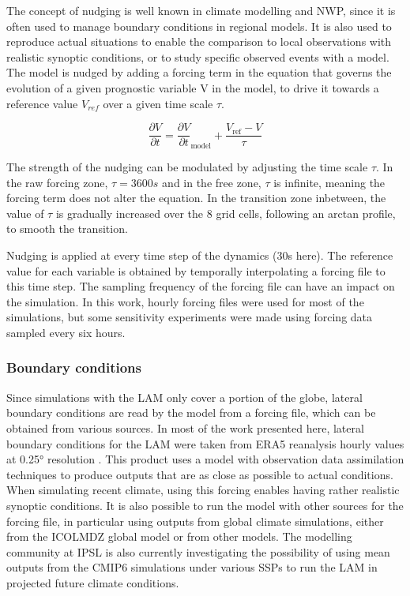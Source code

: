 The concept of nudging is well known in climate modelling and NWP, since it is often used to manage boundary conditions in regional models. It is also used to reproduce actual situations to enable the comparison to local observations with realistic synoptic conditions, or to study specific observed events with a model. The model is nudged by adding a forcing term in the equation that governs the evolution of a given prognostic variable V in the model, to drive it towards a reference value $V_{ref}$ over a given time scale $\tau$.

\begin{equation}
    \frac{\partial V}{\partial t} = \frac{\partial V}{\partial t}_{\text{model}}+ \frac{V_{\text{ref}} - V}{\tau}
\end{equation}

The strength of the nudging can be modulated by adjusting the time scale $\tau$.
In the raw forcing zone, $\tau = 3600s$ and in the free zone, $\tau$ is infinite, meaning the forcing term does not alter the equation. In the transition zone inbetween, the value of $\tau$ is gradually increased over the 8 grid cells, following an arctan profile, to smooth the transition.

Nudging is applied at every time step of the dynamics (30s here). The reference value for each variable is obtained by temporally interpolating a forcing file to this time step. The sampling frequency of the forcing file can have an impact on the simulation. In this work, hourly forcing files were used for most of the simulations, but some sensitivity experiments were made using forcing data sampled every six hours.

\subsubsection{Boundary conditions}
Since simulations with the LAM only cover a portion of the globe, lateral boundary conditions are read by the model from a forcing file, which can be obtained from various sources. 
In most of the work presented here, lateral boundary conditions for the LAM were taken from ERA5 reanalysis hourly values at 0.25° resolution \citep{hersbach_era5_2020}.  This product uses a model with observation data assimilation techniques to produce outputs that are as close as possible to actual conditions. When simulating recent climate, using this forcing enables having rather realistic synoptic conditions. 
It is also possible to run the model with other sources for the forcing file, in particular using outputs from global climate simulations, either from the ICOLMDZ global model or from other models. The modelling community at IPSL is also currently investigating the possibility of using mean outputs from the CMIP6 simulations under various SSPs to run the LAM in projected future climate conditions.

